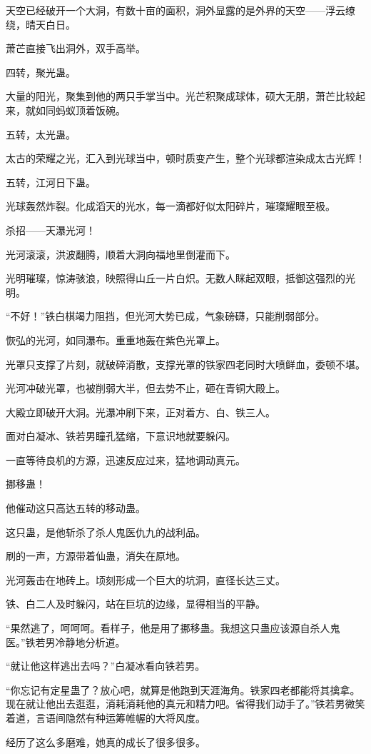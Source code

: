 \begin{this_body}
天空已经破开一个大洞，有数十亩的面积，洞外显露的是外界的天空——浮云缭绕，晴天白日。

萧芒直接飞出洞外，双手高举。

四转，聚光蛊。

大量的阳光，聚集到他的两只手掌当中。光芒积聚成球体，硕大无朋，萧芒比较起来，就如同蚂蚁顶着饭碗。

五转，太光蛊。

太古的荣耀之光，汇入到光球当中，顿时质变产生，整个光球都渲染成太古光辉！

五转，江河日下蛊。

光球轰然炸裂。化成滔天的光水，每一滴都好似太阳碎片，璀璨耀眼至极。

杀招——天瀑光河！

光河滚滚，洪波翻腾，顺着大洞向福地里倒灌而下。

光明璀璨，惊涛骇浪，映照得山丘一片白炽。无数人眯起双眼，抵御这强烈的光明。

“不好！”铁白棋竭力阻挡，但光河大势已成，气象磅礴，只能削弱部分。

恢弘的光河，如同瀑布。重重地轰在紫色光罩上。

光罩只支撑了片刻，就破碎消散，支撑光罩的铁家四老同时大喷鲜血，委顿不堪。

光河冲破光罩，也被削弱大半，但去势不止，砸在青铜大殿上。

大殿立即破开大洞。光瀑冲刷下来，正对着方、白、铁三人。

面对白凝冰、铁若男瞳孔猛缩，下意识地就要躲闪。

一直等待良机的方源，迅速反应过来，猛地调动真元。

挪移蛊！

他催动这只高达五转的移动蛊。

这只蛊，是他斩杀了杀人鬼医仇九的战利品。

刷的一声，方源带着仙蛊，消失在原地。

光河轰击在地砖上。顷刻形成一个巨大的坑洞，直径长达三丈。

铁、白二人及时躲闪，站在巨坑的边缘，显得相当的平静。

“果然逃了，呵呵呵。看样子，他是用了挪移蛊。我想这只蛊应该源自杀人鬼医。”铁若男冷静地分析道。

“就让他这样逃出去吗？”白凝冰看向铁若男。

“你忘记有定星蛊了？放心吧，就算是他跑到天涯海角。铁家四老都能将其擒拿。现在就让他出去逛逛，消耗消耗他的真元和精力吧。省得我们动手了。”铁若男微笑着道，言语间隐然有种运筹帷幄的大将风度。

经历了这么多磨难，她真的成长了很多很多。


\end{this_body}
